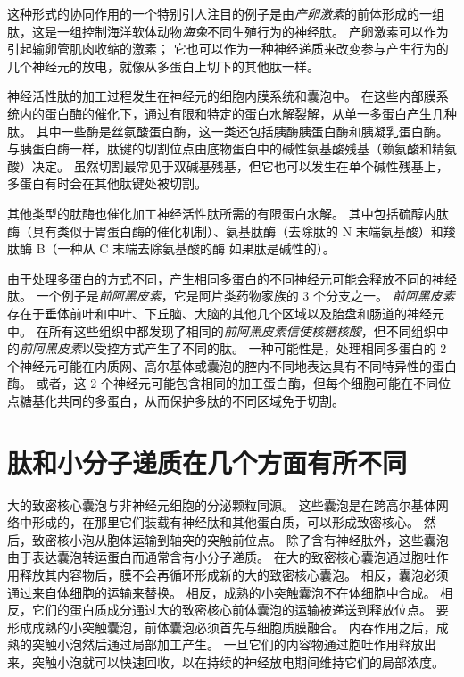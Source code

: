 这种形式的协同作用的一个特别引人注目的例子是由\textit{产卵激素}的前体形成的一组肽，这是一组控制海洋软体动物\textit{海兔}不同生殖行为的神经肽。
产卵激素可以作为引起输卵管肌肉收缩的激素；
它也可以作为一种神经递质来改变参与产生行为的几个神经元的放电，就像从多蛋白上切下的其他肽一样。


神经活性肽的加工过程发生在神经元的细胞内膜系统和囊泡中。
在这些内部膜系统内的蛋白酶的催化下，通过有限和特定的蛋白水解裂解，从单一多蛋白产生几种肽。
其中一些酶是丝氨酸蛋白酶，这一类还包括胰酶胰蛋白酶和胰凝乳蛋白酶。
与胰蛋白酶一样，肽键的切割位点由底物蛋白中的碱性氨基酸残基（赖氨酸和精氨酸）决定。
虽然切割最常见于双碱基残基，但它也可以发生在单个碱性残基上，多蛋白有时会在其他肽键处被切割。


其他类型的肽酶也催化加工神经活性肽所需的有限蛋白水解。
其中包括硫醇内肽酶（具有类似于胃蛋白酶的催化机制）、氨基肽酶（去除肽的 N 末端氨基酸）和羧肽酶 B（一种从 C 末端去除氨基酸的酶 如果肽是碱性的）。


由于处理多蛋白的方式不同，产生相同多蛋白的不同神经元可能会释放不同的神经肽。
一个例子是\textit{前阿黑皮素}，它是阿片类药物家族的 3 个分支之一。
\textit{前阿黑皮素}存在于垂体前叶和中叶、下丘脑、大脑的其他几个区域以及胎盘和肠道的神经元中。
在所有这些组织中都发现了相同的\textit{前阿黑皮素}\textit{信使核糖核酸}，但不同组织中的\textit{前阿黑皮素}以受控方式产生了不同的肽。
一种可能性是，处理相同多蛋白的 2 个神经元可能在内质网、高尔基体或囊泡的腔内不同地表达具有不同特异性的蛋白酶。
或者，这 2 个神经元可能包含相同的加工蛋白酶，但每个细胞可能在不同位点糖基化共同的多蛋白，从而保护多肽的不同区域免于切割。



\section{肽和小分子递质在几个方面有所不同}

大的致密核心囊泡与非神经元细胞的分泌颗粒同源。
这些囊泡是在跨高尔基体网络中形成的，在那里它们装载有神经肽和其他蛋白质，可以形成致密核心。
然后，致密核小泡从胞体运输到轴突的突触前位点。
除了含有神经肽外，这些囊泡由于表达囊泡转运蛋白而通常含有小分子递质。
在大的致密核心囊泡通过胞吐作用释放其内容物后，膜不会再循环形成新的大的致密核心囊泡。
相反，囊泡必须通过来自体细胞的运输来替换。
相反，成熟的小突触囊泡不在体细胞中合成。
相反，它们的蛋白质成分通过大的致密核心前体囊泡的运输被递送到释放位点。
要形成成熟的小突触囊泡，前体囊泡必须首先与细胞质膜融合。
内吞作用之后，成熟的突触小泡然后通过局部加工产生。 
一旦它们的内容物通过胞吐作用释放出来，突触小泡就可以快速回收，以在持续的神经放电期间维持它们的局部浓度。


